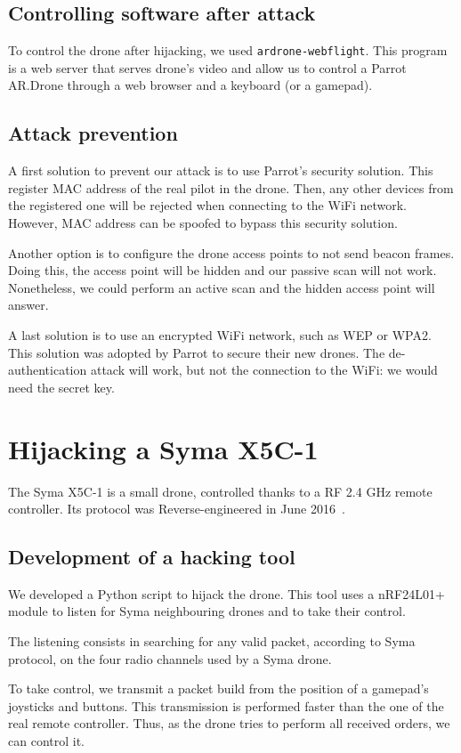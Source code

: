 \documentclass[conference,a4paper]{IEEEtran}
\newcommand{\myv}[1]{\texttt{\small#1}}
\begin{document}
\subsection{Controlling software after attack}
To control the drone after hijacking, we used \myv{ardrone-webflight}. This program is
a web server that serves drone's video and allow us to control a Parrot AR.Drone through a
web browser and a keyboard (or a gamepad).

\subsection{Attack prevention}
A first solution to prevent our attack is to use Parrot's security solution. This
register MAC address of the real pilot in the drone. Then, any other devices from the
registered one will be rejected when connecting to the WiFi network. However, MAC address
can be spoofed to bypass this security solution.

Another option is to configure the drone access points to not send beacon frames. Doing
this, the access point will be hidden and our passive scan will not work. Nonetheless, we
could perform an active scan and the hidden access point will answer.

A last solution is to use an encrypted WiFi network, such as WEP or WPA2. This solution
was adopted by Parrot to secure their new drones. The de-authentication attack will work,
but not the connection to the WiFi: we would need the secret key.



\section{Hijacking a Syma X5C-1}
The Syma X5C-1 is a small drone, controlled thanks to a RF 2.4 GHz remote controller. Its
protocol was Reverse-engineered in June 2016~\cite{bib:syma}.

\subsection{Development of a hacking tool}
We developed a Python script to hijack the drone. This tool uses a nRF24L01+ module to
listen for Syma neighbouring drones and to take their control.

The listening consists in searching for any valid packet, according to Syma protocol, on
the four radio channels used by a Syma drone.

To take control, we transmit a packet build from the position of a gamepad's joysticks and
buttons. This transmission is performed faster than the one of the real remote controller.
Thus, as the drone tries to perform all received orders, we can control it.
\end{document}

